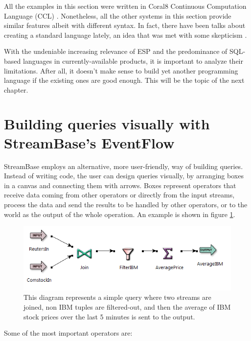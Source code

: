 All the examples in this section were written in Coral8 Continuous
Computation Language (CCL) \cite{coral8-ccl:www}. Nonetheless, all the
other systems in this section provide similar features albeit with
different syntax. In fact, there have been talks about creating a
standard language lately, an idea that was met with some skepticism
\cite{sql-impendance-mismatch:post}.

With the undeniable increasing relevance of ESP and the predominance
of SQL-based languages in currently-available products, it is
important to analyze their limitations. After all, it doesn't make
sense to build yet another programming language if the existing ones
are good enough. This will be the topic of the next chapter.

\section{Building queries visually with StreamBase's EventFlow}
\label{sec:eventflow}

StreamBase employs an alternative, more user-friendly, way of building
queries. Instead of writing code, the user can design queries
visually, by arranging boxes in a canvas and connecting them with
arrows. Boxes represent operators that receive data coming from other
operators or directly from the input streams, process the data and
send the results to be handled by other operators, or to the world as
the output of the whole operation. An example is shown in figure
\ref{fig:eventflow-sample}.

\begin{figure}[htbp]
  \centering
  \includegraphics[width=\textwidth]{eventflow.png}
  \caption{This diagram represents a simple query where two streams
    are joined, non IBM tuples are filtered-out, and then the average
    of IBM stock prices over the last 5 minutes is sent to the
    output.}
  \label{fig:eventflow-sample}
\end{figure}

Some of the most important operators are:

